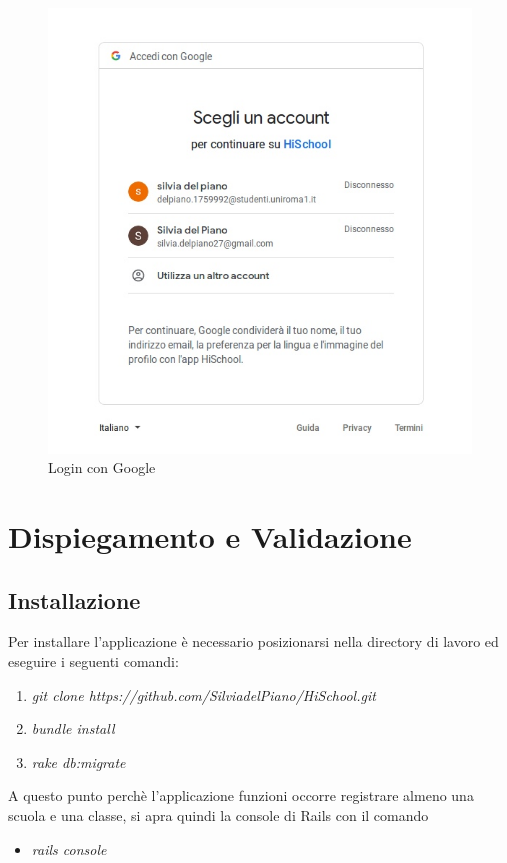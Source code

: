\documentclass[Lau, binding=0.6cm, oneside]{sapthesis}
\begin{document}
\begin{figure}[H]
	\centering
	\includegraphics[width=1\linewidth]{images/google_oauth} 
	\caption{Login con Google}
	\label{fig:google_oauth}
\end{figure}


\chapter{Dispiegamento e Validazione}

\section{Installazione}

Per installare l'applicazione è necessario posizionarsi nella directory di lavoro ed eseguire i seguenti comandi:
\begin{enumerate}
	\item \textit{git clone https://github.com/SilviadelPiano/HiSchool.git}
	\item \textit{bundle install}
	\item \textit{rake db:migrate}
\end{enumerate}

A questo punto perchè l'applicazione funzioni occorre registrare almeno una scuola e una classe, si apra quindi la console di Rails con il comando
\begin{itemize}
	\item \textit{rails console}
\end{itemize}
\end{document}
